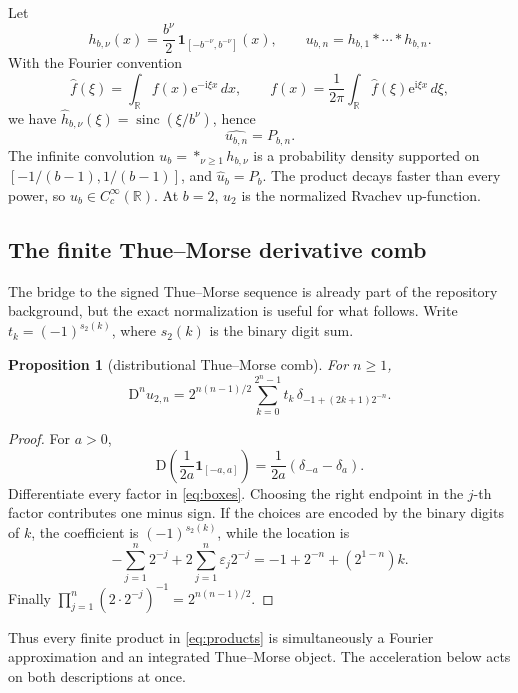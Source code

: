 \documentclass[11pt]{article}
\newtheorem{proposition}[theorem]{Proposition}
\theoremstyle{definition}
\theoremstyle{remark}
\newcommand{\sinc}{\operatorname{sinc}}
\newcommand{\e}{\mathrm{e}}
\newcommand{\ii}{\mathrm{i}}
\newcommand{\R}{\mathbb{R}}
\newcommand{\D}{\mathrm{D}}
\begin{document}
Let
\begin{equation}
 h_{b,\nu}(x)=\frac{b^\nu}{2}\,\mathbf 1_{[-b^{-\nu},b^{-\nu}]}(x),
 \qquad
 u_{b,n}=h_{b,1}*\cdots*h_{b,n}.
 \label{eq:boxes}
\end{equation}
With the Fourier convention
\[
 \widehat f(\xi)=\int_{\R}f(x)\e^{-\ii\xi x}\,dx,
 \qquad
 f(x)=\frac1{2\pi}\int_{\R}\widehat f(\xi)\e^{\ii\xi x}\,d\xi,
\]
we have \(\widehat h_{b,\nu}(\xi)=\sinc(\xi/b^\nu)\), hence
\begin{equation}
 \widehat{u_{b,n}}=P_{b,n}.
 \label{eq:finiteFT}
\end{equation}
The infinite convolution \(u_b=*_{\nu\geq1}h_{b,\nu}\) is a probability density
supported on \([-1/(b-1),1/(b-1)]\), and \(\widehat u_b=P_b\). The product
decays faster than every power, so \(u_b\in C_c^\infty(\R)\). At \(b=2\),
\(u_2\) is the normalized Rvachev up-function.

\subsection{The finite Thue--Morse derivative comb}

The bridge to the signed Thue--Morse sequence is already part of the repository
background, but the exact normalization is useful for what follows. Write
\(t_k=(-1)^{s_2(k)}\), where \(s_2(k)\) is the binary digit sum.

\begin{proposition}[distributional Thue--Morse comb]
For \(n\geq1\),
\begin{equation}
 \D^n u_{2,n}
 =2^{n(n-1)/2}\sum_{k=0}^{2^n-1}t_k\,
 \delta_{-1+(2k+1)2^{-n}}.
 \label{eq:TMcomb}
\end{equation}
\end{proposition}

\begin{proof}
For \(a>0\),
\[
 \D\left(\frac1{2a}\mathbf1_{[-a,a]}\right)
 =\frac1{2a}(\delta_{-a}-\delta_a).
\]
Differentiate every factor in \eqref{eq:boxes}. Choosing the right endpoint in
the \(j\)-th factor contributes one minus sign. If the choices are encoded by
the binary digits of \(k\), the coefficient is \((-1)^{s_2(k)}\), while the
location is
\[
 -\sum_{j=1}^n2^{-j}+2\sum_{j=1}^n\varepsilon_j2^{-j}
 =-1+2^{-n}+(2^{1-n})k.
\]
Finally \(\prod_{j=1}^n(2\cdot2^{-j})^{-1}=2^{n(n-1)/2}\).
\end{proof}

Thus every finite product in \eqref{eq:products} is simultaneously a Fourier
approximation and an integrated Thue--Morse object. The acceleration below acts
on both descriptions at once.
\end{document}

